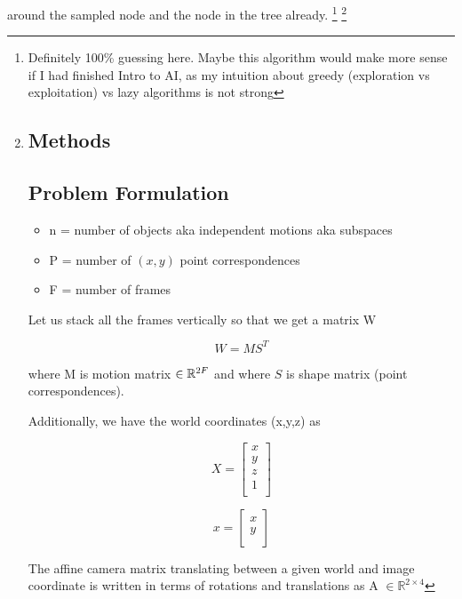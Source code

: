 \documentclass[a4paper]{article}
\begin{document}
around the sampled node and the node in the tree already. \footnote{Definitely 100\% guessing here. Maybe this algorithm would make more sense if I had finished Intro to AI, as my intuition about greedy
(exploration vs exploitation) vs lazy algorithms is not strong} \footnote{

\section{Methods}

\subsection{Problem Formulation}

\newcommand{\matx}[1]{\mbox{\tt #1}} \newcommand{\vect}[1]{{\bf #1}}

\begin{itemize} \item n = number of objects aka independent motions aka subspaces \item P = number of $(x, y)$ point correspondences \item F = number
of frames \end{itemize}

Let us stack all the frames vertically so that we get a matrix W

$$W = MS^T$$

where M is motion matrix $\in \mathbb{R}^{2F \time 4}$ and where $S$ is shape matrix (point correspondences).

Additionally, we have the world coordinates (x,y,z) as

\begin{equation} X = \begin{bmatrix} x \\ y \\ z \\ 1 \\ \end{bmatrix} \end{equation}

\begin{equation} x = \begin{bmatrix} x \\ y \\ \end{bmatrix} \end{equation}

The affine camera matrix translating between a given world and image coordinate is written in terms of rotations and translations as A $\in
\mathbb{R}^{2 \times 4}$

}
\end{document}
